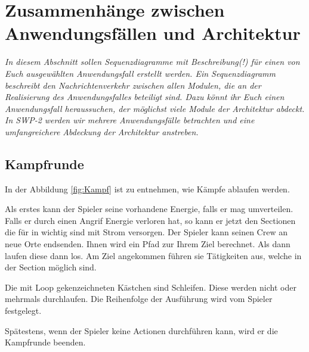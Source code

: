 \documentclass[fontsize=12pt,paper=a4,twoside]{scrartcl}
\begin{document}
\section{Zusammenhänge zwischen Anwendungsfällen und Architektur}
 \label{sec:anwendungsfaelle}

{\itshape In diesem Abschnitt sollen Sequenzdiagramme mit Beschreibung(!) für 
%
{einen von Euch ausgewählten Anwendungsfall}
erstellt werden. Ein Sequenzdiagramm beschreibt den Nachrichtenverkehr zwischen 
allen Modulen, die an der Realisierung des Anwendungsfalles beteiligt sind. 
%
{Dazu könnt ihr Euch einen Anwendungsfall heraussuchen, der möglichst viele 
Module der  Architektur abdeckt. In SWP-2 werden wir mehrere Anwendungsfälle
betrachten und eine umfangreichere Abdeckung der Architektur anstreben.} }


\subsection{Kampfrunde}

In der Abbildung \ref{fig:Kampf} ist zu entnehmen, wie Kämpfe ablaufen werden.


Als erstes kann der Spieler seine vorhandene Energie, falls er mag umverteilen.
Falls er durch einen Angrif Energie verloren hat, so kann er jetzt den Sectionen
die für in wichtig sind mit Strom versorgen.
Der Spieler kann seinen Crew an neue Orte endsenden. Ihnen wird ein Pfad zur Ihrem Ziel
berechnet. Als dann laufen diese dann los. Am Ziel angekommen führen sie Tätigkeiten aus, welche in der Section möglich sind.

Die mit Loop gekenzeichneten Kästchen sind Schleifen. Diese werden nicht oder mehrmals durchlaufen. Die Reihenfolge der Ausführung wird vom Spieler festgelegt.

Spätestens, wenn der Spieler keine Actionen durchführen kann, wird er die Kampfrunde beenden.
\end{document}
